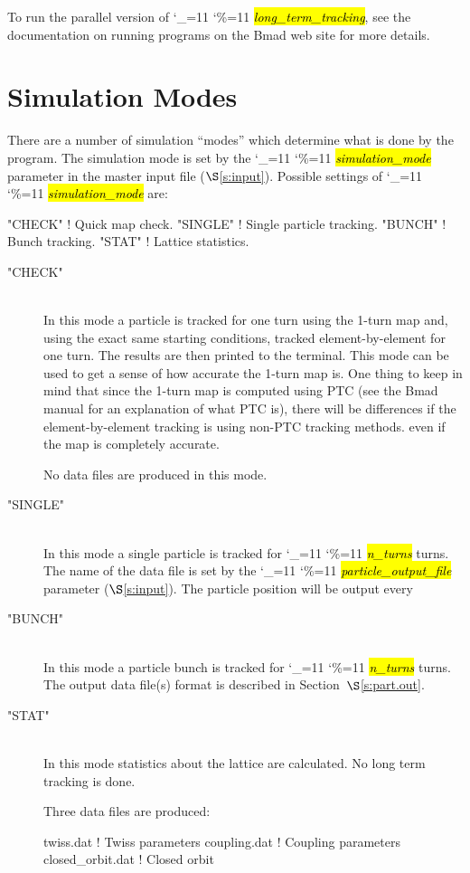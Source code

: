 \documentclass{hitec}
\newcommand\dottcmd[1]{\hl{\em#1}\endgroup}
\newcommand{\vn}{\begingroup\catcode`\_=11 \catcode`\%=11 \dottcmd}
\newcommand{\ltt}{\vn{long_term_tracking}\xspace}
\newcommand{\Newline}{\hfil \\}
\newcommand{\sref}[1]{$\S$\ref{#1}}
\newcommand{\Section}[1]{\section{#1}\vspace*{-1ex}}
\begin{document}
To run the parallel version of \ltt, see the documentation on running programs on the Bmad web site
for more details.

\Section{Simulation Modes}
\label{s:sim.modes}

There are a number of simulation ``modes'' which determine what is done by the program. The
simulation mode is set by the \vn{simulation_mode} parameter in the master input file
(\sref{s:input}).  Possible settings of \vn{simulation_mode} are:
\begin{code}
  "CHECK"   ! Quick map check.
  "SINGLE"  ! Single particle tracking.
  "BUNCH"   ! Bunch tracking.
  "STAT"    ! Lattice statistics.
\end{code}

\begin{description}
\item["CHECK"] \Newline
In this mode a particle is tracked for one turn using the 1-turn map and, using the exact same
starting conditions, tracked element-by-element for one turn. The results are then printed to the
terminal. This mode can be used to get a sense of how accurate the 1-turn map is. One thing to keep
in mind that since the 1-turn map is computed using PTC (see the Bmad manual for an explanation of
what PTC is), there will be differences if the element-by-element tracking is using non-PTC tracking
methods. even if the map is completely accurate. 

No data files are produced in this mode.
%
\item["SINGLE"] \Newline
In this mode a single particle is tracked for \vn{n_turns} turns. The name of the data file is set
by the \vn{particle_output_file} parameter (\sref{s:input}). The particle position will be output every

%
\item["BUNCH"] \Newline
In this mode a particle bunch is tracked for \vn{n_turns} turns. The output data file(s) format is
described in Section~\sref{s:part.out}.
%
\item["STAT"] \Newline
In this mode statistics about the lattice are calculated. No long term tracking is done.

Three data files are produced: 
\begin{code}
  twiss.dat         ! Twiss parameters
  coupling.dat      ! Coupling parameters
  closed_orbit.dat  ! Closed orbit
\end{code}
\end{description}
\end{document}
